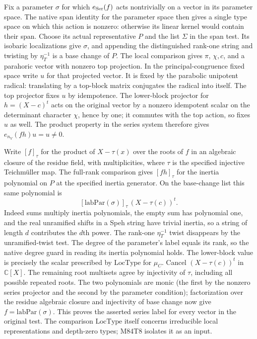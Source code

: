 Fix a parameter $\sigma$ for which $e_{\rm Ser}(f)$ acts
nontrivially on a vector in its parameter space. The native
span identity for the parameter space then gives a single
type space on which this action is nonzero: otherwise its
linear kernel would contain their span. Choose its actual
representative $P$ and the list $\Sigma$ in the span test.
Its isobaric localizations give $\sigma$, and appending the
distinguished rank-one string and twisting by $\eta_T^{-1}$
is a base change of $P$. The local comparison gives $\pi$,
$\chi,c$, and a parahoric vector with nonzero top projection.
In the principal-congruence fixed space write $u$ for that
projected vector. It is fixed by the parabolic unipotent
radical: translating by a top-block matrix conjugates the
radical into itself. The top projector fixes $u$ by
idempotence. The lower-block projector for
$h=(X-c)^t$ acts on the original vector by a nonzero
idempotent scalar on the determinant character $\chi$,
hence by one; it commutes with the top action, so fixes
$u$ as well. The product property in the series system
therefore gives $e_{n_V}(fh)u=u\ne0$.

Write $[f]_\tau$ for the product of $X-\tau(x)$ over
the roots of $f$ in an algebraic closure of the residue
field, with multiplicities, where $\tau$ is the specified
injective Teichm\"uller map. The full-rank comparison gives
$[fh]_\tau$ for the inertia polynomial on $P$ at the
specified inertia generator. On the base-change list this
same polynomial is
\[
       [\mathrm{labPar}(\sigma)]_\tau\,(X-\tau(c))^t.
\]
Indeed sums multiply inertia polynomials, the empty sum has
polynomial one, and the real unramified shifts in a Speh
string have trivial inertia, so a string of length $d$
contributes the $d$th power. The rank-one $\eta_T^{-1}$
twist disappears by the unramified-twist test. The
degree of the parameter's label equals its rank, so the
native degree guard in reading its inertia polynomial
holds. The lower-block value is precisely the scalar
prescribed by $\mathrm{LocType}$ for $\mu_C$. Cancel
$(X-\tau(c))^t$ in $\mathbb C[X]$. The remaining
root multisets agree by injectivity of $\tau$, including
all possible repeated roots. The two polynomials are monic
(the first by the nonzero series projector and the second by
the parameter condition); factorization over the residue
algebraic closure and injectivity of base change now give
$f=\mathrm{labPar}(\sigma)$. This proves the asserted
series label for every vector in the original test. The
comparison $\mathrm{LocType}$ itself concerns irreducible
local representations and depth-zero types; M84T8 isolates
it as an input.

